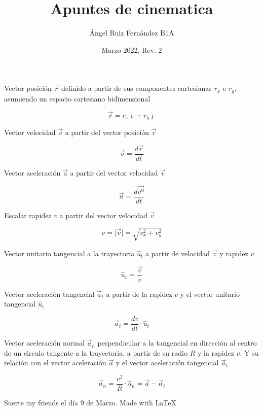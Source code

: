 \documentclass[12pt, letterpaper, twoside]{article}
\title{Apuntes de cinematica}
\author{Ángel Ruiz Fernández B1A}
\date{Marzo 2022, Rev. 2}
\begin{document}
	\maketitle
	
	Vector posición $\vec{r}$ definido a partir de sus componentes cartesianas $r_x$ e $r_y$, asumiendo un espacio cartesiano bidimensional
	
	\begin{equation}
		\vec{r} = r_x \hat{\imath} + r_y \hat{\jmath}
	\end{equation}
	
	Vector velocidad $\vec{v}$ a partir del vector posición $\vec{r}$
	
	\begin{equation}
		\vec{v} = \dfrac{d\vec{r}}{dt}
	\end{equation}
	
	Vector aceleración $\vec{a}$ a partir del vector velocidad $\vec{v}$
	
	\begin{equation}
		\vec{a} = \dfrac{d\vec{vº}}{dt}
	\end{equation}
	
	Escalar rapidez $v$ a partir del vector velocidad $\vec{v}$
	
	\begin{equation}
		v = \lvert \vec{v} \lvert = \sqrt{v_x^2 + v_y^2}
	\end{equation}
	
	Vector unitario tangencial a la trayectoria $\hat{u}_t$ a partir de velocidad $\vec{v}$ y rapidez $v$
	
	\begin{equation}
		\hat{u}_t = \frac{\vec{v}}{v}
	\end{equation}
	
	Vector aceleración tangencial $\vec{a}_t$ a partir de la rapidez $v$ y el vector unitario tangencial $\hat{u}_t$
	
	\begin{equation}
		\vec{a}_t = \dfrac{dv}{dt} \cdot \hat{u}_t
	\end{equation}
	
	Vector aceleración normal $\vec{a}_n$ perpendicular a la tangencial en dirección al centro de un circulo tangente a la trayectoria, a partir de su radio $R$ y la rapidez $v$. Y su relación con el vector aceleración $\vec{a}$ y el vector aceleración tangencial $\vec{a}_t$
	
	\begin{equation}
		\vec{a}_n = \frac{v^2}{R} \cdot \hat{u}_n = \vec{a} - \vec{a}_t
	\end{equation}
	
	Suerte my friends el día 9 de Marzo. Made with \LaTeX
\end{document}
